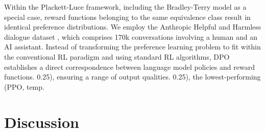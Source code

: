 \begin{lemma}
\begin{theorem}
\begin{lemma}\label{lemma:same_prefrence} Within the Plackett-Luce framework, including the Bradley-Terry model as a special case, reward functions belonging to the same equivalence class result in identical preference distributions. We employ the Anthropic Helpful and Harmless dialogue dataset \citep{bai2022training}, which comprises 170k conversations involving a human and an AI assistant. Instead of transforming the preference learning problem to fit within the conventional RL paradigm and using standard RL algorithms, DPO establishes a direct correspondence between language model policies and reward functions. 0.25), ensuring a range of output qualities. 0.25), the lowest-performing (PPO, temp. \section{Discussion}

\end{lemma}
\end{theorem}
\end{lemma}

